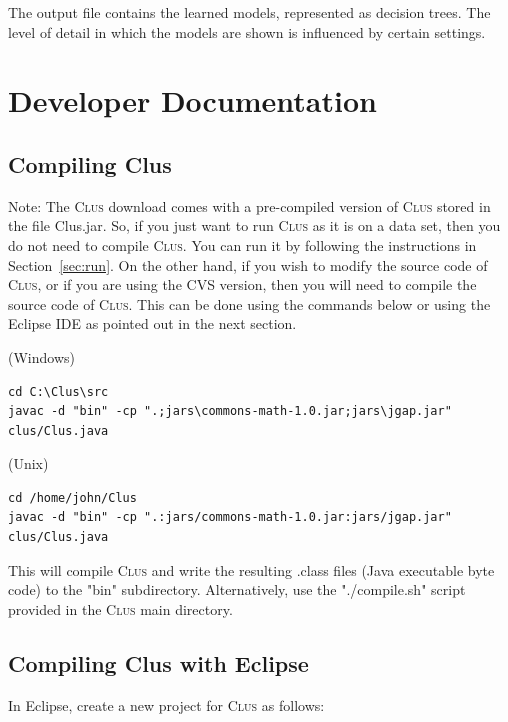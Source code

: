 \documentclass[a4paper]{report}
\newcommand{\clus}{\textsc{Clus}}
\begin{document}
The output file contains the learned models, represented as decision trees.  The level of detail in which the models are shown is influenced by certain settings.

\chapter{Developer Documentation}
\label{ch:devel}

\section{Compiling Clus}

Note: The \clus{} download comes with a pre-compiled version of \clus{} stored in the file Clus.jar. So, if you just want to run \clus{} as it is on a data set, then you do not need to compile \clus{}. You can run it by following the instructions in Section~\ref{sec:run}. On the other hand, if you wish to modify the source code of \clus{}, or if you are using the CVS version, then you will need to compile the source code of \clus{}. This can be done using the commands
below or using the Eclipse IDE as pointed out in the next section.

\vspace*{1em}\noindent(Windows)

\begin{small}
\begin{verbatim}
cd C:\Clus\src
javac -d "bin" -cp ".;jars\commons-math-1.0.jar;jars\jgap.jar" clus/Clus.java
\end{verbatim}
\end{small}

\noindent(Unix)

\begin{small}
\begin{verbatim}
cd /home/john/Clus
javac -d "bin" -cp ".:jars/commons-math-1.0.jar:jars/jgap.jar" clus/Clus.java
\end{verbatim}
\end{small}
This will compile \clus{} and write the resulting .class files (Java executable 
byte code) to the "bin" subdirectory.
%
Alternatively, use the "./compile.sh" script provided in the \clus{} main directory.

\section{Compiling Clus with Eclipse}

In Eclipse, create a new project for \clus{} as follows:
\end{document}
